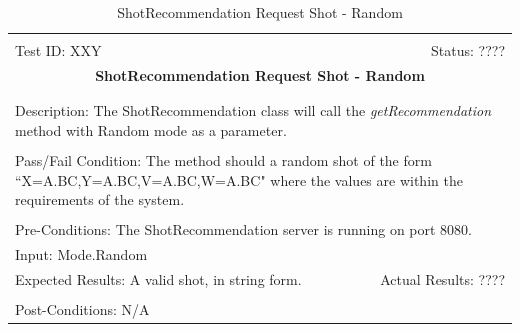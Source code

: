 \documentclass[11pt]{article}
\begin{document}
\begin{center}
\begin{table}[H]
\begin{tabular}{|l r|}\hline&\\[-2mm]
	Test ID: XXY	&Status: ????\\[-3mm]
	\multicolumn{2}{|c|}{\textbf{\large{ShotRecommendation Request Shot - Random}}}\\&\\\hline&\\[-3mm]
	\multicolumn{2}{|p{\textwidth}|}{Description: The ShotRecommendation class will call the \textit{getRecommendation} method with Random mode as a parameter.}\\[1mm]\hline&\\[-3mm]
	\multicolumn{2}{|p{\textwidth}|}{Pass/Fail Condition: The method should a random shot of the form ``X=A.BC,Y=A.BC,V=A.BC,W=A.BC" where the values are within the requirements of the system.}\\[1mm]\hline&\\[-3mm]
	\multicolumn{2}{|p{\textwidth}|}{Pre-Conditions: The ShotRecommendation server is running on port 8080.}\\[4mm]
	\multicolumn{2}{|p{\textwidth}|}{Input: Mode.Random}\\[2mm]\hline
	\multicolumn{1}{|p{0.49\textwidth}}{Expected Results: A valid shot, in string form.}	&\multicolumn{1}{|p{0.45\textwidth}|}{Actual Results: ????}\\\hline&\\[-3mm]
	\multicolumn{2}{|p{\textwidth}|}{Post-Conditions: N/A}\\\hline
\end{tabular}
\caption{ShotRecommendation Request Shot - Random}
\end{table}
\end{center}
\end{document}
